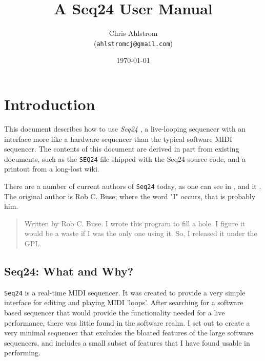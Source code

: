 \documentclass[
 11pt,
 twoside,
 a4paper,
 headinclude,
 footinclude,
 final                                 %
]{article}
\begin{document}
\title{A Seq24 User Manual}
\author{Chris Ahlstrom\\
   (\texttt{ahlstromcj@gmail.com})}
\date{\today}
\maketitle
\tableofcontents
\listoffigures                         %
\listoftables                          %


\setlength{\parindent}{0pt}
\setlength{\parskip}{1ex plus 0.5ex minus 0.2ex}

\section{Introduction}
\label{sec:introduction}

   This document describes how to use \textsl{Seq24} \cite{seq24},
   a live-looping sequencer with an interface more like a hardware sequencer
   than the typical software MIDI sequencer.  The contents of this document
   are derived in part from existing documents, such as the \texttt{SEQ24}
   file shipped with the Seq24 source code, and a printout from a
   long-lost wiki.

   There are a number of current authors of \texttt{Seq24} today,
   as one can see in
   ,
   and it
   .
   The original author is Rob C. Buse; where the word "I" occurs, that is
   probably him.

   \begin{quotation}
      Written by Rob C. Buse.  I wrote this program to fill a
      hole.  I figure it would be a waste if I was the only one
      using it.  So, I released it under the GPL.
   \end{quotation}

\subsection{Seq24: What and Why?}
\label{subsec:introduction_seq24_vs_others}

   \texttt{Seq24} is a real-time MIDI sequencer. It was created to 
   provide a very simple interface for editing and playing 
   MIDI 'loops'. After searching for a software based 
   sequencer that would provide the functionality needed for 
   a live performance, there was little found in the 
   software realm. I set out to create a very minimal sequencer 
   that excludes the bloated features of the large software 
   sequencers, and includes a small subset of features that 
   I have found usable in performing. 
\end{document}
